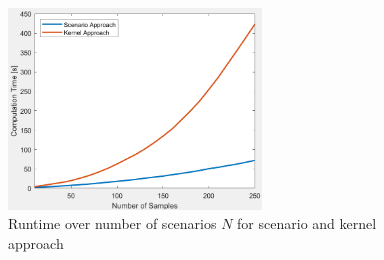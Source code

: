 \begin{figure}[htb]
\centering
\includegraphics[width=0.6\textwidth]{pics/computationtime_plot.png}
\caption{Runtime over number of scenarios $N$ for scenario and kernel approach}
\label{fig:runtime_plot}
\end{figure}
\fi